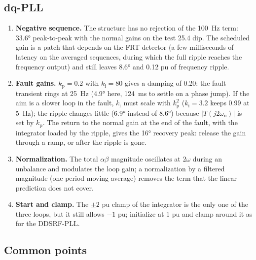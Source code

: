 \documentclass[11pt,a4paper]{scrartcl}
\newcommand{\ped}[1]{_{\mathrm{#1}}}
\begin{document}
\begin{onehalfspace}
\subsection{dq-PLL}
\label{sec:critdq}

\begin{enumerate}
	\item \textbf{Negative sequence.} The structure has no rejection of the \SI{100}{\hertz} term: \ang{33.6} peak-to-peak with the normal gains on the test 25.4 dip. The scheduled gain is a patch that depends on the FRT detector (a few milliseconds of latency on the averaged sequences, during which the full ripple reaches the frequency output) and still leaves \ang{8.6} and \num{0.12} pu of frequency ripple.
	\item \textbf{Fault gains.} $k\ped{p} = 0.2$ with $k\ped{i} = 80$ gives a damping of \num{0.20}: the fault transient rings at \SI{25}{\hertz} (\ang{4.9} here, \SI{124}{\milli\second} to settle on a phase jump). If the aim is a slower loop in the fault, $k\ped{i}$ must scale with $k\ped{p}^2$ ($k\ped{i} = 3.2$ keeps \num{0.99} at \SI{5}{\hertz}); the ripple changes little (\ang{6.9} instead of \ang{8.6}) because $|T(j2\omega\ped{n})|$ is set by $k\ped{p}$. The return to the normal gain at the end of the fault, with the integrator loaded by the ripple, gives the \ang{16} recovery peak: release the gain through a ramp, or after the ripple is gone.
	\item \textbf{Normalization.} The total $\alpha\beta$ magnitude oscillates at $2\omega$ during an unbalance and modulates the loop gain; a normalization by a filtered magnitude (one period moving average) removes the term that the linear prediction does not cover.
	\item \textbf{Start and clamp.} The $\pm 2$ pu clamp of the integrator is the only one of the three loops, but it still allows $-1$ pu; initialize at \num{1} pu and clamp around it as for the DDSRF-PLL.
\end{enumerate}

\subsection{Common points}
\label{sec:critcommon}


\end{onehalfspace}
\end{document}
